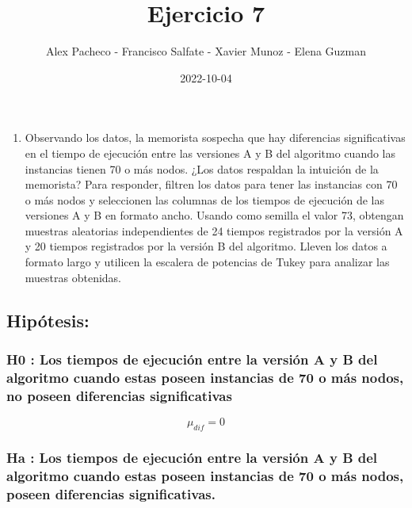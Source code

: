 \documentclass[
]{article}
\title{Ejercicio 7}
\author{Alex Pacheco - Francisco Salfate - Xavier Munoz - Elena Guzman}
\date{2022-10-04}
\providecommand{\tightlist}{%
  \setlength{\itemsep}{0pt}\setlength{\parskip}{0pt}}
\begin{document}
\maketitle

\begin{enumerate}
\def\labelenumi{\arabic{enumi}.}
\tightlist
\item
  Observando los datos, la memorista sospecha que hay diferencias
  significativas en el tiempo de ejecución entre las versiones A y B del
  algoritmo cuando las instancias tienen 70 o más nodos. ¿Los datos
  respaldan la intuición de la memorista? Para responder, filtren los
  datos para tener las instancias con 70 o más nodos y seleccionen las
  columnas de los tiempos de ejecución de las versiones A y B en formato
  ancho. Usando como semilla el valor 73, obtengan muestras aleatorias
  independientes de 24 tiempos registrados por la versión A y 20 tiempos
  registrados por la versión B del algoritmo. Lleven los datos a formato
  largo y utilicen la escalera de potencias de Tukey para analizar las
  muestras obtenidas.
\end{enumerate}

\hypertarget{hipuxf3tesis}{%
\subsection{Hipótesis:}\label{hipuxf3tesis}}

\hypertarget{h0-los-tiempos-de-ejecuciuxf3n-entre-la-versiuxf3n-a-y-b-del-algoritmo-cuando-estas-poseen-instancias-de-70-o-muxe1s-nodos-no-poseen-diferencias-significativas}{%
\subsubsection{\texorpdfstring{\textbf{H0 : Los tiempos de ejecución
entre la versión A y B del algoritmo cuando estas poseen instancias de
70 o más nodos, no poseen diferencias
significativas}}{H0 : Los tiempos de ejecución entre la versión A y B del algoritmo cuando estas poseen instancias de 70 o más nodos, no poseen diferencias significativas}}\label{h0-los-tiempos-de-ejecuciuxf3n-entre-la-versiuxf3n-a-y-b-del-algoritmo-cuando-estas-poseen-instancias-de-70-o-muxe1s-nodos-no-poseen-diferencias-significativas}}

\[ \mu_{dif} = 0 \]

\hypertarget{ha-los-tiempos-de-ejecuciuxf3n-entre-la-versiuxf3n-a-y-b-del-algoritmo-cuando-estas-poseen-instancias-de-70-o-muxe1s-nodos-poseen-diferencias-significativas.}{%
\subsubsection{\texorpdfstring{\textbf{Ha : Los tiempos de ejecución
entre la versión A y B del algoritmo cuando estas poseen instancias de
70 o más nodos, poseen diferencias
significativas.}}{Ha : Los tiempos de ejecución entre la versión A y B del algoritmo cuando estas poseen instancias de 70 o más nodos, poseen diferencias significativas.}}\label{ha-los-tiempos-de-ejecuciuxf3n-entre-la-versiuxf3n-a-y-b-del-algoritmo-cuando-estas-poseen-instancias-de-70-o-muxe1s-nodos-poseen-diferencias-significativas.}}
\end{document}
